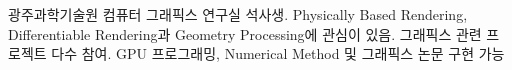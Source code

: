 %
%
%
\par{
광주과학기술원 컴퓨터 그래픽스 연구실 석사생. Physically Based Rendering, Differentiable Rendering과 Geometry Processing에 관심이 있음. 그래픽스 관련 프로젝트 다수 참여. GPU 프로그래밍, Numerical Method 및 그래픽스 논문 구현 가능
}